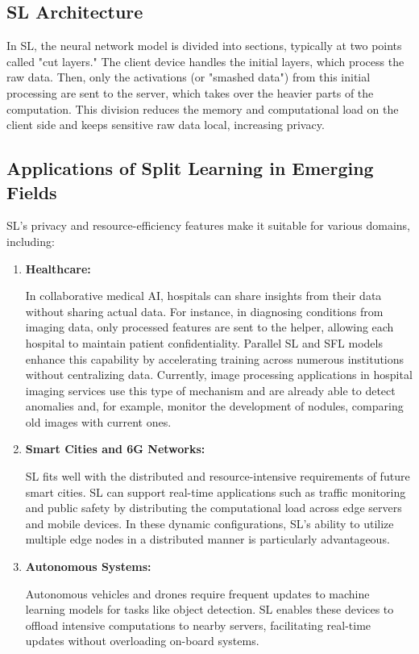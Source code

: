\subsection{SL Architecture}
\label{sec:sl_architecture}

In SL, the neural network model is divided into sections, typically at two points called "cut layers." The client device handles the initial layers, which process the raw data. Then, only the activations (or "smashed data") from this initial processing are sent to the server, which takes over the heavier parts of the computation. This division reduces the memory and computational load on the client side and keeps sensitive raw data local, increasing privacy.

\subsection{Applications of Split Learning in Emerging Fields}
\label{sec:application_of_sl_in_emerging_fields}


SL's privacy and resource-efficiency features make it suitable for various domains, including:

\begin{enumerate}
	\item \textbf{Healthcare:}
	
	In collaborative medical AI, hospitals can share insights from their data without sharing actual data. For instance, in diagnosing conditions from imaging data, only processed features are sent to the helper, allowing each hospital to maintain patient confidentiality. Parallel SL and SFL models enhance this capability by accelerating training across numerous institutions without centralizing data. Currently, image processing applications in hospital imaging services use this type of mechanism and are already able to detect anomalies and, for example, monitor the development of nodules, comparing old images with current ones. 
	\item \textbf{Smart Cities and 6G Networks:}
	
	SL fits well with the distributed and resource-intensive requirements of future smart cities. SL can support real-time applications such as traffic monitoring and public safety by distributing the computational load across edge servers and mobile devices. In these dynamic configurations, SL’s ability to utilize multiple edge nodes in a distributed manner is particularly advantageous. 
	\item \textbf{Autonomous Systems:}
	 
	Autonomous vehicles and drones require frequent updates to machine learning models for tasks like object detection. SL enables these devices to offload intensive computations to nearby servers, facilitating real-time updates without overloading on-board systems. ​

\end{enumerate}


